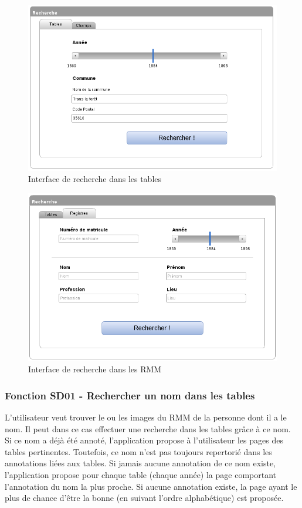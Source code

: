 \documentclass[a4paper]{article}
\begin{document}
\begin{figure}[H]
\centering
\includegraphics[width=\textwidth]{rechercheTables.png}
\caption{Interface de recherche dans les tables}
\label{fig:rechercheTables}
\end{figure}

\begin{figure}[H]
\centering
\includegraphics[width=\textwidth]{rechercheRegistres.png}
\caption{Interface de recherche dans les RMM}
\label{fig:rechercheRMM}
\end{figure}

\subsubsection{Fonction SD01 - Rechercher un nom dans les tables}

L'utilisateur veut trouver le ou les images du RMM de la personne dont il a le nom. Il peut dans ce cas effectuer une recherche dans les tables grâce à ce nom. Si ce nom a déjà été annoté, l'application propose à l'utilisateur les pages des tables pertinentes. Toutefois, ce nom n'est pas toujours repertorié dans les annotations liées aux tables. Si jamais aucune annotation de ce nom existe, l'application propose pour chaque table (chaque année) la page comportant l'annotation du nom la plus proche. Si aucune annotation existe, la page ayant le plus de chance d'être la bonne (en suivant l'ordre alphabétique) est proposée.
\\
\end{document}
